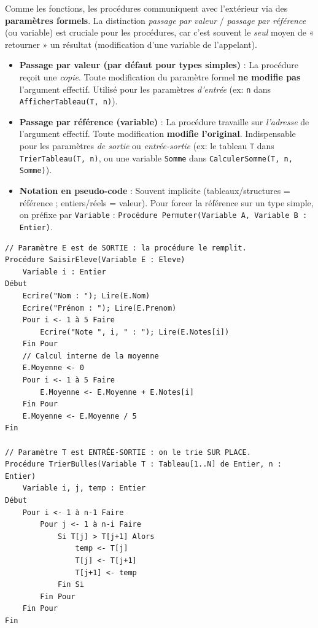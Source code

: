 \documentclass[11pt]{article}
\begin{document}
Comme les fonctions, les procédures communiquent avec l'extérieur via des \textbf{paramètres formels}. La distinction \emph{passage par valeur} / \emph{passage par référence} (ou variable) est cruciale pour les procédures, car c'est souvent le \emph{seul} moyen de « retourner » un résultat (modification d'une variable de l'appelant).

\begin{propriete}
\begin{itemize}
    \item \textbf{Passage par valeur (par défaut pour types simples)} : La procédure reçoit une \emph{copie}. Toute modification du paramètre formel \textbf{ne modifie pas} l'argument effectif. Utilisé pour les paramètres \emph{d'entrée} (ex: \texttt{n} dans \texttt{AfficherTableau(T, n)}).
    \item \textbf{Passage par référence (variable)} : La procédure travaille sur \emph{l'adresse} de l'argument effectif. Toute modification \textbf{modifie l'original}. Indispensable pour les paramètres \emph{de sortie} ou \emph{entrée-sortie} (ex: le tableau \texttt{T} dans \texttt{TrierTableau(T, n)}, ou une variable \texttt{Somme} dans \texttt{CalculerSomme(T, n, Somme)}).
    \item \textbf{Notation en pseudo-code} : Souvent implicite (tableaux/structures = référence ; entiers/réels = valeur). Pour forcer la référence sur un type simple, on préfixe par \texttt{Variable} : \texttt{Procédure Permuter(Variable A, Variable B : Entier)}.
\end{itemize}
\end{propriete}

\begin{exemplebox}
\begin{lstlisting}
// Paramètre E est de SORTIE : la procédure le remplit.
Procédure SaisirEleve(Variable E : Eleve)
    Variable i : Entier
Début
    Ecrire("Nom : "); Lire(E.Nom)
    Ecrire("Prénom : "); Lire(E.Prenom)
    Pour i <- 1 à 5 Faire
        Ecrire("Note ", i, " : "); Lire(E.Notes[i])
    Fin Pour
    // Calcul interne de la moyenne
    E.Moyenne <- 0
    Pour i <- 1 à 5 Faire
        E.Moyenne <- E.Moyenne + E.Notes[i]
    Fin Pour
    E.Moyenne <- E.Moyenne / 5
Fin

// Paramètre T est ENTRÉE-SORTIE : on le trie SUR PLACE.
Procédure TrierBulles(Variable T : Tableau[1..N] de Entier, n : Entier)
    Variable i, j, temp : Entier
Début
    Pour i <- 1 à n-1 Faire
        Pour j <- 1 à n-i Faire
            Si T[j] > T[j+1] Alors
                temp <- T[j]
                T[j] <- T[j+1]
                T[j+1] <- temp
            Fin Si
        Fin Pour
    Fin Pour
Fin
\end{lstlisting}
\end{exemplebox}
\end{document}
